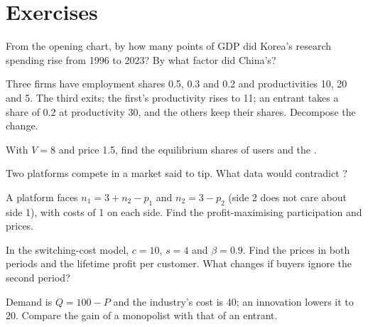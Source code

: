 \section{Exercises}\label{sec:b3:platforms-and-innovation:exercises}

\begin{exercise}[$\star$]\label{exo:b3:platforms-and-innovation:1}
From the opening chart, by how many points of GDP did Korea's research spending rise
from 1996 to 2023? By what factor did China's?
\end{exercise}

\begin{exercise}[$\star$]\label{exo:b3:platforms-and-innovation:2}
Three firms have employment shares 0.5, 0.3 and 0.2 and productivities 10, 20 and 5. The third exits;
the first's productivity rises to 11; an entrant takes a share of 0.2 at productivity 30, and the
others keep their shares. Decompose the change.
\end{exercise}

\begin{exercise}[$\star$]\label{exo:b3:platforms-and-innovation:3}
With $V = 8$ and price 1.5, find the equilibrium shares of users and the .
\end{exercise}

\begin{exercise}[$\star$]\label{exo:b3:platforms-and-innovation:4}
Two platforms compete in a market said to tip. What data would contradict ?
\end{exercise}

\begin{exercise}[$\star\star$]\label{exo:b3:platforms-and-innovation:5}
A platform faces $n_1 = 3 + n_2 - p_1$ and $n_2 = 3 - p_2$ (side 2 does not care about side 1), with costs of 1 on each
side. Find the profit-maximising participation and prices.
\end{exercise}

\begin{exercise}[$\star\star$]\label{exo:b3:platforms-and-innovation:6}
In the switching-cost model, $c = 10$, $s = 4$ and $\beta = 0.9$. Find the prices in both periods and the lifetime
profit per customer. What changes if buyers ignore the second period?
\end{exercise}

\begin{exercise}[$\star\star$]\label{exo:b3:platforms-and-innovation:7}
Demand is $Q = 100 - P$ and the industry's cost is 40; an innovation lowers it to 20. Compare the
gain of a monopolist with that of an entrant.
\end{exercise}

